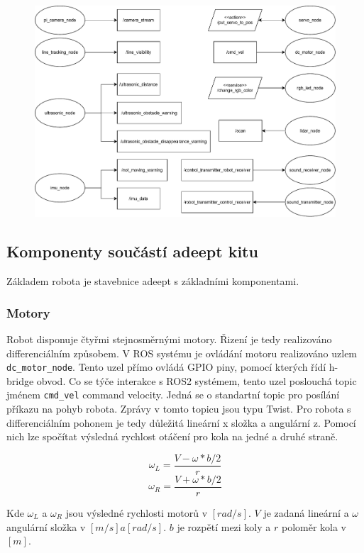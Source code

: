 \begin{figure}[h!]
	\centering
	\includegraphics[scale=0.5]{obrazky-figures/hardware_nodes.pdf}
	\caption{}
	\label{}
\end{figure}

\subsection*{Komponenty součástí adeept kitu}
Základem robota je stavebnice adeept s základními komponentami.

\subsubsection*{Motory}
Robot disponuje čtyřmi stejnosměrnými motory. Řizení je tedy realizováno differenciálním způsobem. 
V ROS systému je ovládání motoru realizováno uzlem \verb|dc_motor_node|. Tento uzel přímo ovládá GPIO piny, pomocí kterých řídí h-bridge obvod. Co se týče interakce s ROS2 systémem, tento uzel poslouchá topic jménem \verb|cmd_vel| command velocity. Jedná se o standartní topic pro posílání příkazu na pohyb robota. Zprávy v tomto topicu jsou typu Twist. Pro robota s differenciálním pohonem je tedy důležitá lineární x složka a angulární z. Pomocí nich lze spočítat výsledná rychlost otáčení pro kola na jedné a druhé straně.

$$\omega_L = \frac{V - \omega * b/2}{r}$$
$$\omega_R = \frac{V + \omega * b/2}{r}$$

\noindent Kde $\omega_L$ a $\omega_R$ jsou výsledné rychlosti motorů v $[rad/s]$. $V$ je zadaná lineární a $\omega$ angulární složka v $[m/s] a [rad/s]$. $b$ je rozpětí mezi koly a $r$ poloměr kola v $[m]$.

